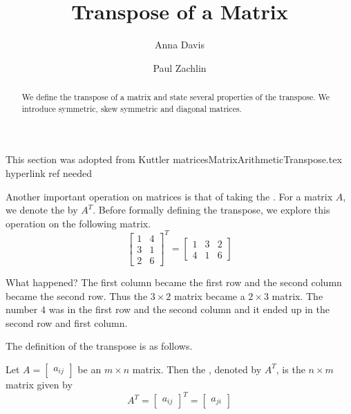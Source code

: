 \documentclass{ximera}
\author{Anna Davis \and Paul Zachlin} \title{Transpose of a Matrix} \license{CC-BY 4.0}
\begin{document}
\begin{abstract}
  We define the transpose of a matrix and state several properties of the transpose.  We introduce symmetric, skew symmetric and diagonal matrices.
\end{abstract}
\maketitle






{\color{red} This section was adopted from Kuttler matricesMatrixArithmeticTranspose.tex hyperlink ref needed}

Another important operation on matrices is that of taking the . For a matrix $A$, we denote the
 by $A^T$. Before formally defining the transpose, we explore this
operation on the following matrix.
\begin{equation*}
\begin{bmatrix}
1 & 4 \\
3 & 1 \\
2 & 6
\end{bmatrix}^{T}=
\begin{bmatrix}
1 & 3 & 2 \\
4 & 1 & 6
\end{bmatrix}
\end{equation*}

What happened? The first column became the first row and the second column
became the second row. Thus the $3\times 2$ matrix became a $2\times 3$
matrix. The number $4$ was in the first row and the second column and it
ended up in the second row and first column. 

The definition of the transpose is as follows.

\begin{definition}\label{def:matrixtranspose}
Let $A=\begin{bmatrix} a _{ij}\end{bmatrix}$ be an $m\times n$ matrix. Then the , denoted by $A^{T}$, is the $n\times m$
matrix given by 
\begin{equation*}
A^{T} = \begin{bmatrix} a _{ij}\end{bmatrix}^{T}= \begin{bmatrix} a_{ji} \end{bmatrix}
\end{equation*}
\end{definition}
\end{document}
